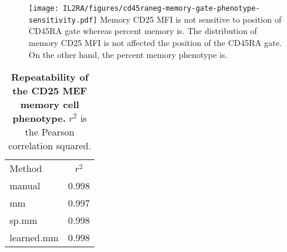 \begin{figure}[h]
  \texttt{[image: IL2RA/figures/cd45raneg-memory-gate-phenotype-sensitivity.pdf]}
{ Memory CD25 MFI is not sensitive to position of CD45RA gate whereas percent memory is. }
{
  The distribution of memory CD25 MFI is not affected the position of the CD45RA gate.
  On the other hand, the percent memory phenotype is.
}
\end{figure}


\begin{table} [h]
\centering
\begin{tabular} {|lc|}
\cline{1-2}
Method & $r^2$ \\
\cline{1-2}
manual     & 0.998 \\
mm         & 0.997 \\
sp.mm      & 0.998 \\
learned.mm & 0.998 \\
\cline{1-2}
\end{tabular}
\caption{  
  \label{table:repeatability-memory-cell-MEF-phenotype}
  \textbf{Repeatability of the CD25 MEF memory cell phenotype.}
  $r^2$ is the Pearson correlation squared.
}
\end{table}

